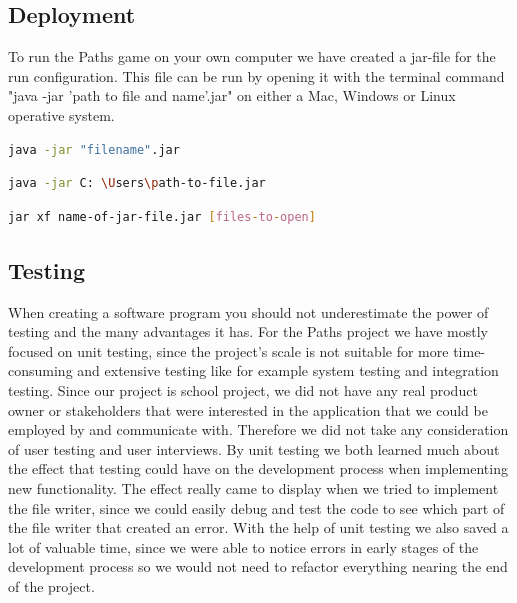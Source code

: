 \documentclass[British]{article}
\begin{document}
\subsection{Deployment}
To run the Paths game on your own computer we have created a jar-file for the run configuration. This file can be run by opening it with the terminal command "java -jar 'path to file and name'.jar" on either a Mac, Windows or Linux operative system. 
\begin{lstlisting}[language=bash,caption={Mac version}]
    java -jar "filename".jar
\end{lstlisting}
\begin{lstlisting}[language=bash,caption={Windows version}]
    java -jar C: \Users\path-to-file.jar
\end{lstlisting}
\begin{lstlisting}[language=bash,caption={Linux version}]
    jar xf name-of-jar-file.jar [files-to-open]
\end{lstlisting}


\subsection{Testing}
When creating a software program you should not underestimate the power of testing and the many advantages it has. For the Paths project we have mostly focused on unit testing, since the project's scale is not suitable for more time-consuming and extensive testing like for example system testing and integration testing. Since our project is school project, we did not have any real product owner or stakeholders that were interested in the application that we could be employed by and communicate with. Therefore we did not take any consideration of user testing and user interviews. By unit testing we both learned much about the effect that testing could have on the development process when implementing new functionality. The effect really came to display when we tried to implement the file writer, since we could easily debug and test the code to see which part of the file writer that created an error. With the help of unit testing we also saved a lot of valuable time, since we were able to notice errors in early stages of the development process so we would not need to refactor everything nearing the end of the project. 
\end{document}
